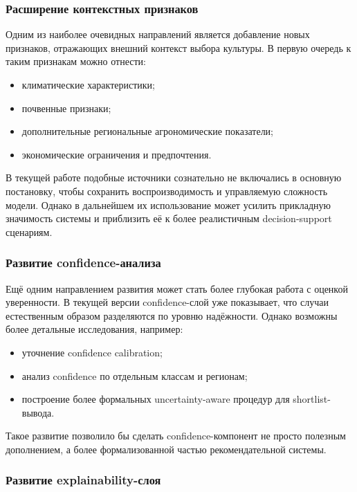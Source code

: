 \subsubsection{Расширение контекстных признаков}

Одним из наиболее очевидных направлений является добавление новых признаков, отражающих внешний контекст выбора
культуры. В первую очередь к таким признакам можно отнести:

\begin{itemize}
\tightlist
\item
  климатические характеристики;
\item
  почвенные признаки;
\item
  дополнительные региональные агрономические показатели;
\item
  экономические ограничения и предпочтения.
\end{itemize}

В текущей работе подобные источники сознательно не включались в основную постановку, чтобы сохранить воспроизводимость и
управляемую сложность модели. Однако в дальнейшем их использование может усилить прикладную значимость системы и
приблизить её к более реалистичным decision-support сценариям.

\subsubsection{Развитие confidence-анализа}

Ещё одним направлением развития может стать более глубокая работа с оценкой уверенности. В текущей версии
confidence-слой уже показывает, что случаи естественным образом разделяются по уровню надёжности. Однако возможны более
детальные исследования, например:

\begin{itemize}
\tightlist
\item
  уточнение confidence calibration;
\item
  анализ confidence по отдельным классам и регионам;
\item
  построение более формальных uncertainty-aware процедур для shortlist-вывода.
\end{itemize}

Такое развитие позволило бы сделать confidence-компонент не просто полезным дополнением, а более формализованной частью
рекомендательной системы.

\subsubsection{Развитие explainability-слоя}


